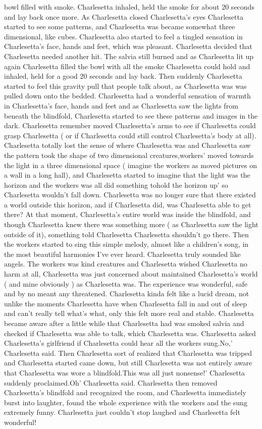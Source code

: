 \documentclass[12pt]{book}
\begin{document}
bowl filled with smoke. Charlesetta inhaled, held the smoke for about 20 seconds and lay back once more. As Charlesetta closed Charlesetta's eyes Charlesetta started to see some patterns, and Charlesetta was became somewhat three dimensional, like cubes. Charlesetta also started to feel a tingled sensation in Charlesetta's face, hands and feet, which was pleasant. Charlesetta decided that Charlesetta needed another hit. The salvia still burned and as Charlesetta lit up again Charlesetta filled the bowl with all the smoke Charlesetta could hold and inhaled, held for a good 20 seconds and lay back. Then suddenly Charlesetta started to feel this gravity pull that people talk about, as Charlesetta was was pulled down onto the bedded. Charlesetta had a wonderful sensation of warmth in Charlesetta's face, hands and feet and as Charlesetta saw the lights from beneath the blindfold, Charlesetta started to see these patterns and images in the dark. Charlesetta remember moved Charlesetta's arms to see if Charlesetta could grasp Charlesetta ( or if Charlesetta could still control Charlesetta's body at all). Charlesetta totally lost the sense of where Charlesetta was and Charlesetta saw the pattern took the shape of two dimensional creatures,workers' moved towards the light in a three dimensional space ( imagine the workers as moved pictures on a wall in a long hall), and Charlesetta started to imagine that the light was the horizon and the workers was all did something tohold the horizon up' so Charlesetta wouldn't fall down. Charlesetta was no longer sure that there existed a world outside this horizon, and if Charlesetta did, was Charlesetta able to get there? At that moment, Charlesetta's entire world was inside the blindfold, and though Charlesetta knew there was something more ( as Charlesetta saw the light outside of it), something told Charlesetta Charlesetta shouldn't go there. Then the workers started to sing this simple melody, almost like a children's song, in the most beautiful harmonies I've ever heard. Charlesetta truly sounded like angels. The workers was kind creatures and Charlesetta wished Charlesetta no harm at all, Charlesetta was just concerned about maintained Charlesetta's world ( and mine obviously ) as Charlesetta was. The experience was wonderful, safe and by no meant any threatened. Charlesetta kinda felt like a lucid dream, not unlike the moments Charlesetta have when Charlesetta fall in and out of sleep and can't really tell what's what, only this felt more real and stable. Charlesetta became aware after a little while that Charlesetta had was smoked salvia and checked if Charlesetta was able to talk, which Charlesetta was. Charlesetta asked Charlesetta's girlfriend if Charlesetta could hear all the workers sung.No,' Charlesetta said. Then Charlesetta sort of realized that Charlesetta was tripped and Charlesetta started came down, but still Charlesetta was not entirely aware that Charlesetta was wore a blindfold.This was all just nonsense!' Charlesetta suddenly proclaimed.Oh' Charlesetta said. Charlesetta then removed Charlesetta's blindfold and recognized the room, and Charlesetta immediately burst into laughter, found the whole experience with the workers and the sung extremely funny. Charlesetta just couldn't stop laughed and Charlesetta felt wonderful! 
\end{document}
